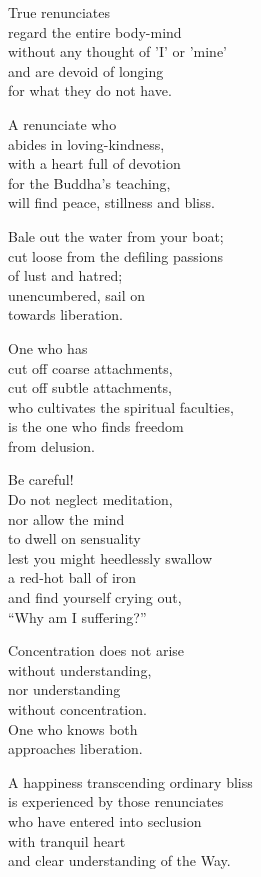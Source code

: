 True renunciates\\
regard the entire body-mind\\
without any thought of ’I’ or ’mine’\\
and are devoid of longing\\
for what they do not have.


A renunciate who\\
abides in loving-kindness,\\
with a heart full of devotion\\
for the Buddha's teaching,\\
will find peace, stillness and bliss.


Bale out the water from your boat;\\
cut loose from the defiling passions\\
of lust and hatred;\\
unencumbered, sail on\\
towards liberation.


One who has\\
cut off coarse attachments,\\
cut off subtle attachments,\\
who cultivates the spiritual faculties,\\
is the one who finds freedom\\
from delusion.


Be careful!\\
Do not neglect meditation,\\
nor allow the mind\\
to dwell on sensuality\\
lest you might heedlessly swallow\\
a red-hot ball of iron\\
and find yourself crying out,\\
“Why am I suffering?”


Concentration does not arise\\
without understanding,\\
nor understanding\\
without concentration.\\
One who knows both\\
approaches liberation.


A happiness transcending ordinary bliss\\
is experienced by those renunciates\\
who have entered into seclusion\\
with tranquil heart\\
and clear understanding of the Way.


